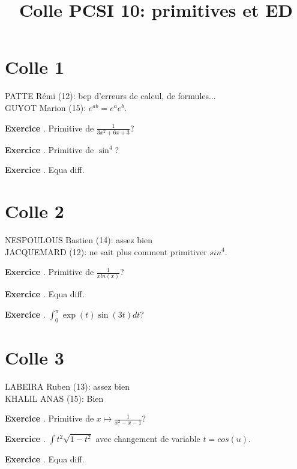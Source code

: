 \documentclass[10pt,a4paper]{article}
\title{Colle PCSI 10: primitives et ED}
\newcounter{question}
\newcounter{exo}
\newenvironment{exo}{\vspace{0.5cm}\setcounter{question}{0}\addtocounter{exo}{1} \noindent \textbf{Exercice \theexo}. \normalsize }{\par}
\begin{document}
	\maketitle

	\section*{Colle 1}
	PATTE Rémi (12): bcp d'erreurs de calcul, de formules...\\
	GUYOT Marion (15): $e^{ab} = e^a e^b$.
	
	\begin{exo}
		Primitive de $\frac{1}{3x^2+6x+3}$?
	\end{exo}
	
	\begin{exo}
		Primitive de $\sin^4$?
	\end{exo}	

	\begin{exo}
		Equa diff.
	\end{exo}	
		
	\section*{Colle 2}
	\setcounter{exo}{0}
	NESPOULOUS Bastien (14): assez bien\\
	JACQUEMARD (12): ne sait plus comment primitiver $sin^4$.
	
	\begin{exo}
		Primitive de $\frac{1}{xln(x)}$?
	\end{exo}

	\begin{exo}
		Equa diff.
	\end{exo}	
	\begin{exo}
		$\int_{0}^{\pi} \exp(t) \sin(3t) dt$?
	\end{exo}	
	\section*{Colle 3}
	\setcounter{exo}{0}
	LABEIRA Ruben (13): assez bien\\
	KHALIL ANAS (15): Bien\\
	
	\begin{exo}
		Primitive de $x \longmapsto \frac{1}{x^2 - x - 1}$?
	\end{exo}

	\begin{exo}
		$\int t^2 \sqrt{1 - t^2}$ avec changement de variable $t = cos(u)$.
	\end{exo}

	\begin{exo}
		Equa diff.
	\end{exo}	
\end{document}
